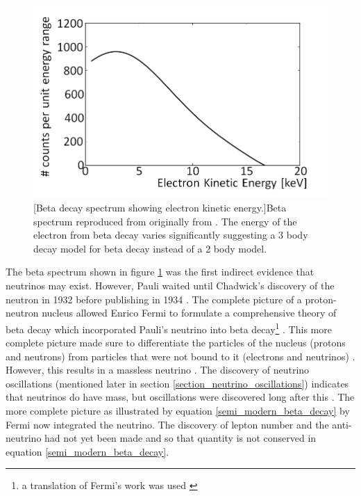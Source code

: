 \begin{figure}[!h]
 \centering
 \includegraphics[width=0.7\linewidth]{Chapter1/Figs/Raster/betaSpectrum.png}
 [Beta decay spectrum showing electron kinetic energy.]{Beta spectrum reproduced from \cite{griffiths2008neutrino1.5} originally from \cite{lewis1970neutrinos}. The energy of the electron from beta decay varies significantly suggesting a 3 body decay model for beta decay instead of a 2 body model.} %
 \label{fig:beta_spectrum}
\end{figure}

The beta spectrum shown in figure \ref{fig:beta_spectrum} was the first indirect evidence that neutrinos may exist. However, Pauli waited until Chadwick's discovery of the neutron in 1932 \cite{chadwick1932possible} before publishing in 1934 \cite{lederman1970resource}. The complete picture of a proton-neutron nucleus allowed Enrico Fermi to formulate a comprehensive theory of beta decay which incorporated Pauli's neutrino into beta decay\footnote{a translation of Fermi's work was used \cite{wilson1968fermi}} \cite{lederman1970resource} \cite{Fermi:1934hr}. This more complete picture made sure to differentiate the particles of the nucleus (protons and neutrons) from particles that were not bound to it (electrons and neutrinos) \cite{Fermi:1934hr} \cite{wilson1968fermi}. However, this results in a massless neutrino \cite{lederman1970resource}. The discovery of neutrino oscillations (mentioned later in section \ref{section_neutrino_oscillations}) indicates that neutrinos do have mass, but oscillations were discovered long after this  \cite{griffiths2008neutrino1.5}. The more complete picture as illustrated by equation \ref{semi_modern_beta_decay} by Fermi now integrated the neutrino. The discovery of lepton number and the anti-neutrino had not yet been made and so that quantity is not conserved in equation \ref{semi_modern_beta_decay}. 

